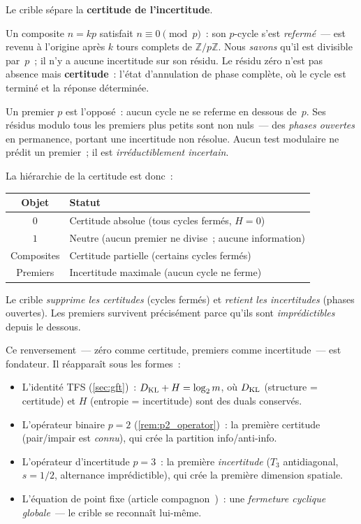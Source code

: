 \documentclass[12pt,a4paper]{article}
\begin{document}
\begin{remarque}
\label{rem:zero_certainty}
Le crible sépare la \textbf{certitude de l'incertitude}.

Un composite $n = kp$ satisfait $n \equiv 0 \pmod{p}$~: son
$p$-cycle s'est \emph{refermé}~--- est revenu à l'origine après $k$
tours complets de $\mathbb{Z}/p\mathbb{Z}$. Nous \emph{savons} qu'il
est divisible par~$p$~; il n'y a aucune incertitude sur son résidu.
Le résidu zéro n'est pas absence mais \textbf{certitude}~: l'état
d'annulation de phase complète, où le cycle est terminé et la réponse
déterminée.

Un premier $p$ est l'opposé~: aucun cycle ne se referme en dessous
de~$p$. Ses résidus modulo tous les premiers plus petits sont non
nuls~--- des \emph{phases ouvertes} en permanence, portant une
incertitude non résolue. Aucun test modulaire ne prédit un premier~;
il est \emph{irréductiblement incertain}.

La hiérarchie de la certitude est donc~:
\begin{center}
\begin{tabular}{cl}
\toprule
\textbf{Objet} & \textbf{Statut} \\
\midrule
$0$     & Certitude absolue (tous cycles fermés, $H = 0$) \\
$1$     & Neutre (aucun premier ne divise~; aucune information) \\
Composites & Certitude partielle (certains cycles fermés) \\
Premiers  & Incertitude maximale (aucun cycle ne ferme) \\
\bottomrule
\end{tabular}
\end{center}
Le crible \emph{supprime les certitudes} (cycles fermés) et
\emph{retient les incertitudes} (phases ouvertes). Les premiers
survivent précisément parce qu'ils sont \emph{imprédictibles}
depuis le dessous.

Ce renversement~--- zéro comme certitude, premiers comme incertitude~---
est fondateur. Il réapparaît sous les formes~:
\begin{itemize}[nosep]
\item L'identité TFS (\cref{sec:gft})~: $D_{\mathrm{KL}} + H = \log_2 m$,
  où $D_{\mathrm{KL}}$ (structure = certitude) et $H$ (entropie = incertitude)
  sont des duals conservés.
\item L'opérateur binaire $p = 2$ (\cref{rem:p2_operator})~:
  la première certitude (pair/impair est \emph{connu}), qui crée
  la partition info/anti-info.
\item L'opérateur d'incertitude $p = 3$~: la première
  \emph{incertitude} ($T_3$ antidiagonal, $s = 1/2$, alternance
  imprédictible), qui crée la première dimension spatiale.
\item L'équation de point fixe (article compagnon~\cite{companion_M3})~:
  une \emph{fermeture cyclique globale}~--- le crible se reconnaît
  lui-même.
\end{itemize}
\end{remarque}
\end{document}

